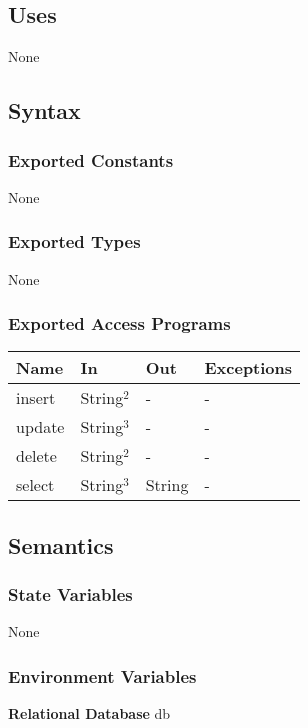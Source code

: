 \documentclass[12pt, titlepage]{article}
\begin{document}
\subsection{Uses}
None

\subsection{Syntax}

\subsubsection{Exported Constants}
None

\subsubsection{Exported Types}
None

\subsubsection{Exported Access Programs}

\begin{center}
\begin{tabular}{p{4cm} p{4cm} p{4cm} p{3cm}}
\hline
\textbf{Name} & \textbf{In} & \textbf{Out} & \textbf{Exceptions} \\
\hline
insert & String$^2$ & - & - \\
update & String$^3$ & - & - \\
delete & String$^2$ & - & - \\
select & String$^3$ & String & - \\
\hline
\end{tabular}
\end{center}

\subsection{Semantics}

\subsubsection{State Variables}
None

\subsubsection{Environment Variables}
\textbf{Relational Database} db
\end{document}
